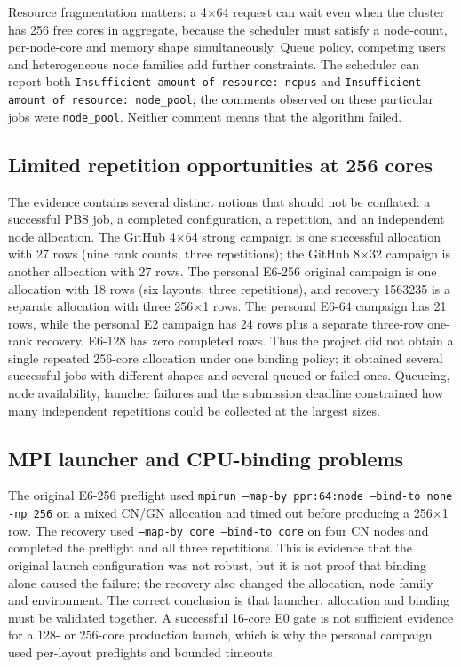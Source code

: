 \documentclass[10pt,a4paper]{article}
\newcommand{\code}[1]{\texttt{#1}}
\begin{document}
Resource fragmentation matters: a 4$\times$64 request can wait even when the
cluster has 256 free cores in aggregate, because the scheduler must satisfy a
node-count, per-node-core and memory shape simultaneously. Queue policy,
competing users and heterogeneous node families add further constraints. The
scheduler can report both \code{Insufficient amount of resource: ncpus} and
\code{Insufficient amount of resource: node\_pool}; the comments observed on
these particular jobs were \code{node\_pool}. Neither comment means that the
algorithm failed.

\subsection{Limited repetition opportunities at 256 cores}
The evidence contains several distinct notions that should not be conflated:
a successful PBS job, a completed configuration, a repetition, and an
independent node allocation. The GitHub 4$\times$64 strong campaign is one
successful allocation with 27 rows (nine rank counts, three repetitions); the
GitHub 8$\times$32 campaign is another allocation with 27 rows. The personal
E6-256 original campaign is one allocation with 18 rows (six layouts, three
repetitions), and recovery 1563235 is a separate allocation with three
256$\times$1 rows. The personal E6-64 campaign has 21 rows, while the personal
E2 campaign has 24 rows plus a separate three-row one-rank recovery. E6-128
has zero completed rows. Thus the project did not obtain a single repeated
256-core allocation under one binding policy; it obtained several successful
jobs with different shapes and several queued or failed ones. Queueing,
node availability, launcher failures and the submission deadline constrained
how many independent repetitions could be collected at the largest sizes.

\subsection{MPI launcher and CPU-binding problems}
The original E6-256 preflight used
\code{mpirun --map-by ppr:64:node --bind-to none -np 256} on a mixed CN/GN
allocation and timed out before producing a 256$\times$1 row. The recovery
used \code{--map-by core --bind-to core} on four CN nodes and completed the
preflight and all three repetitions. This is evidence that the original
launch configuration was not robust, but it is not proof that binding alone
caused the failure: the recovery also changed the allocation, node family and
environment. The correct conclusion is that launcher, allocation and binding
must be validated together. A successful 16-core E0 gate is not sufficient
evidence for a 128- or 256-core production launch, which is why the personal
campaign used per-layout preflights and bounded timeouts.
\end{document}
